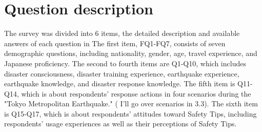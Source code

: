 \section{Question description}
The survey was divided into 6 items, the detailed description and available answers of each question in %
The first item, FQ1-FQ7, consists of seven demographic questions, including nationality, gender, age, travel experience, and Japanese proficiency. The second to fourth items are Q1-Q10, which includes disaster consciousness, disaster training experience, earthquake experience, earthquake knowledge, and disaster response knowledge. The fifth item is Q11-Q14, which is about respondents' response actions in four scenarios during the "Tokyo Metropolitan Earthquake." ( I'll go over scenarios in 3.3). The sixth item is Q15-Q17, which is about respondents' attitudes toward Safety Tips, including respondents' usage experiences as well as their perceptions of Safety Tips.

